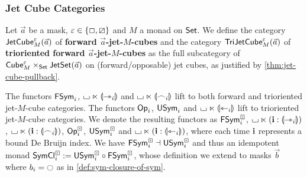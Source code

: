 \documentclass[a4paper]{article}
\begin{document}
\subsubsection{Jet Cube Categories}
\begin{definition} \label{def:jet-cube-cat}
	Let $\vec a$ be a mask, $\varepsilon \in \mathopen{}\left\{ \Box, \boxslash \right\}\mathclose{}$ and $M$ a monad on ${\mathsf{Set}}$.
	We define
	the category $\mathsf{JetCube}^{\varepsilon}_{M}\mathopen{}\left( \vec a \right)\mathclose{}$ of \textbf{forward $\vec a$-jet-$M$-cubes} and
	the category $\mathsf{TriJetCube}^{\varepsilon}_{M}\mathopen{}\left( \vec a \right)\mathclose{}$ of \textbf{trioriented forward $\vec a$-jet-$M$-cubes}
	as the full subcategory of ${\mathsf{Cube}}^\varepsilon_M \times_{\mathsf{Set}} \mathsf{JetSet}(\vec a)$ on (forward/opposable) jet cubes, as justified by \cref{thm:jet-cube-pullback}.
\end{definition}
\begin{proposition} \label{thm:lift-to-jet-cubes}
	The functors $\mathsf{FSym}_i$, ${\llcorner\hspace{-.4ex}\lrcorner} \ltimes {\llparenthesis \rightarrowtriangle_i \rrparenthesis}$ and ${\llcorner\hspace{-.4ex}\lrcorner} \ltimes {\llparenthesis \frown_i \rrparenthesis}$ lift to both forward and trioriented jet-$M$-cube categories.
	The functors ${\mathsf{Op}}_i$, $\mathsf{USym}_i$ and ${\llcorner\hspace{-.4ex}\lrcorner} \ltimes {\llparenthesis \leftarrowtriangle_i \rrparenthesis}$ lift to trioriented jet-$M$-cube categories.
	We denote the resulting functors as $\mathsf{FSym}^\boxdot_i$, ${\llcorner\hspace{-.4ex}\lrcorner} \ltimes (\mathbf{i} : {\llparenthesis \rightarrowtriangle_i \rrparenthesis})$, ${\llcorner\hspace{-.4ex}\lrcorner} \ltimes (\mathbf{i} : {\llparenthesis \frown_i \rrparenthesis})$, ${\mathsf{Op}}^\boxdot_i$, $\mathsf{USym}^\boxdot_i$ and ${\llcorner\hspace{-.4ex}\lrcorner} \ltimes (\mathbf{i} : {\llparenthesis \leftarrowtriangle_i \rrparenthesis})$, where each time $\mathbf{i}$ represents a bound De Bruijn index.
	We have $\mathsf{FSym}^\boxdot_i \dashv \mathsf{USym}^\boxdot_i$ and thus an idempotent monad $\mathsf{SymCl}^\boxdot_i := \mathsf{USym}^\boxdot_i \circ \mathsf{FSym}^\boxdot_i$, whose definition we extend to masks $\vec b$ where $b_i = \npolar$ as in \cref{def:sym-closure-of-sym}.
\end{proposition}
\end{document}
